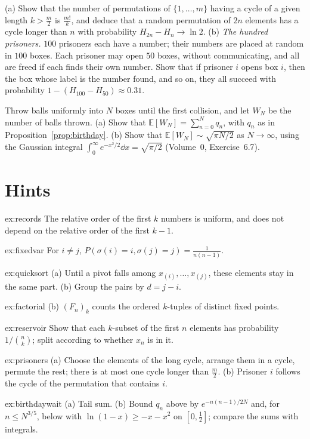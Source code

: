 \begin{exercise}[$\star\star$]\label{ex:prisoners}
(a) Show that the number of permutations of $\{1,\dots,m\}$ having a cycle of a given length $k>\frac m2$ is
$\frac{m!}k$, and deduce that a random permutation of $2n$ elements has a cycle longer than $n$ with probability
$H_{2n}-H_n\to\ln2$. (b) \emph{The hundred prisoners.} $100$ prisoners each have a number; their numbers are placed at random in $100$
boxes. Each prisoner may open $50$ boxes, without communicating, and all are freed if each finds their own number.
Show that if prisoner $i$ opens box $i$, then the box whose label is the number found, and so on, they all succeed
with probability $1-(H_{100}-H_{50})\approx0.31$.
\end{exercise}

\begin{exercise}[$\star\star\star$]\label{ex:birthdaywait}
Throw balls uniformly into $N$ boxes until the first collision, and let $W_N$ be the number of balls thrown. (a)
Show that $\mathbb E[W_N]=\sum_{n=0}^Nq_n$, with $q_n$ as in Proposition~\ref{prop:birthday}. (b) Show that
$\mathbb E[W_N]\sim\sqrt{\pi N/2}$ as $N\to\infty$, using the Gaussian integral $\int_0^\infty e^{-x^2/2}\dd x=\sqrt{\pi/2}$ (Volume~0,
Exercise~6.7).
\end{exercise}

\section{Hints}

\begin{hint}{ex:records}
The relative order of the first $k$ numbers is uniform, and does not depend on the relative order of the first
$k-1$.
\end{hint}
\begin{hint}{ex:fixedvar}
For $i\ne j$, $P(\sigma(i)=i,\sigma(j)=j)=\frac1{n(n-1)}$.
\end{hint}
\begin{hint}{ex:quicksort}
(a) Until a pivot falls among $x_{(i)},\dots,x_{(j)}$, these elements stay in the same part. (b) Group the pairs by $d=j-i$.
\end{hint}
\begin{hint}{ex:factorial}
(b) $(F_n)_k$ counts the ordered $k$-tuples of distinct fixed points.
\end{hint}
\begin{hint}{ex:reservoir}
Show that each $k$-subset of the first $n$ elements has probability $1/\binom nk$; split according to whether $x_{n}$ is in it.
\end{hint}
\begin{hint}{ex:prisoners}
(a) Choose the elements of the long cycle, arrange them in a cycle, permute the rest; there is at most one cycle
longer than $\frac m2$. (b) Prisoner $i$ follows the cycle of the permutation that contains $i$.
\end{hint}
\begin{hint}{ex:birthdaywait}
(a) Tail sum. (b) Bound $q_n$ above by $e^{-n(n-1)/2N}$ and, for $n\le N^{3/5}$, below with $\ln(1-x)\ge-x-x^2$ on
$[0,\frac12]$; compare the sums with integrals.
\end{hint}

